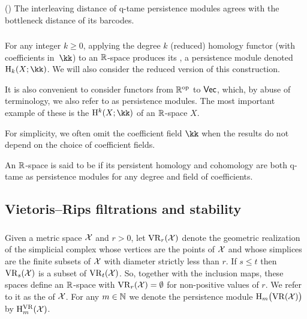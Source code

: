\proposition (\cite[Theorem~5.14]{Chazal.2016a})
The interleaving distance of q-tame persistence modules agrees with the bottleneck distance of its barcodes.

\subsubsection{}

For any integer $k \geq 0$, applying the degree $k$ (reduced) homology functor (with coefficients in~$\kk$) to an $\R$-space produces its , a persistence module denoted $\rH_k(X; \kk)$.
We will also consider the reduced version of this construction.

It is also convenient to consider functors from $\R^\op$ to $\Vec$, which, by abuse of terminology, we also refer to as persistence modules.
The most important example of these is the  $\rH^k(X; \kk)$ of an $\R$-space $X$.

For simplicity, we often omit the coefficient field $\kk$ when the results do not depend on the choice of coefficient fields.

An $\R$-space is said to be  if its persistent homology and cohomology are both q-tame as persistence modules for any degree and field of coefficients.

\subsection{Vietoris--Rips filtrations and stability}

\subsubsection{}

Given a metric space $\cX$ and $r > 0$, let $\VR_r(\cX)$ denote the geometric realization of the simplicial complex whose vertices are the points of $\cX$ and whose simplices are the finite subsets of $\cX$ with diameter strictly less than $r$.
If $s \leq t$ then $\VR_s(\cX)$ is a subset of $\VR_t(\cX)$.
So, together with the inclusion maps, these spaces define an $\R$-space with $\VR_r(\cX) = \emptyset$ for non-positive values of $r$.
We refer to it as the  of $\cX$.
For any \(m \in \N\) we denote the persistence module \(\rH_m\big(\VR(\cX)\big)\) by \(\rH_m^{\VR}(\cX)\).

\subsubsection{}\label{sss:q-tameness}

